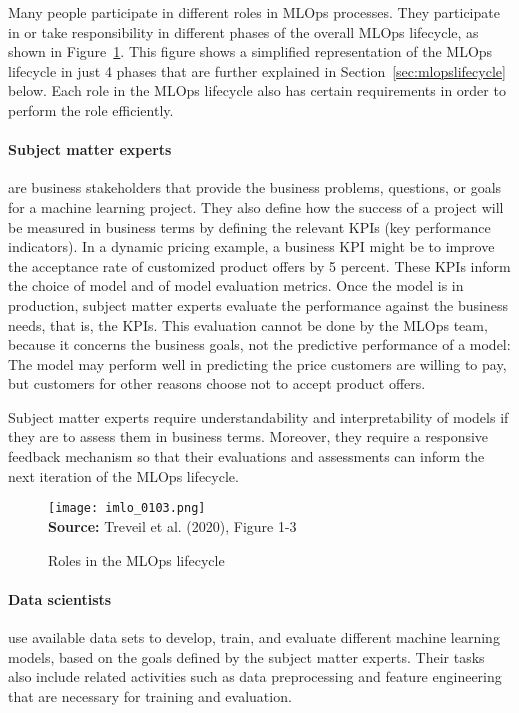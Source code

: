 Many people participate in different roles in MLOps processes. They participate in or take responsibility in different phases of the overall MLOps lifecycle, as shown in Figure~\ref{fig:mlopsroles}. This figure shows a simplified representation of the MLOps lifecycle in just 4 phases that are further explained in Section~\ref{sec:mlopslifecycle} below. Each role in the MLOps lifecycle also has certain requirements in order to perform the role efficiently.

\paragraph*{Subject matter experts} are business stakeholders that provide the business problems, questions, or goals for a machine learning project. They also define how the success of a project will be measured in business terms by defining the relevant KPIs (key performance indicators). In a dynamic pricing example, a business KPI might be to improve the acceptance rate of customized product offers by 5 percent. These KPIs inform the choice of model and of model evaluation metrics. Once the model is in production, subject matter experts evaluate the performance against the business needs, that is, the KPIs. This evaluation cannot be done by the MLOps team, because it concerns the business goals, not the predictive performance of a model: The model may perform well in predicting the price customers are willing to pay, but customers for other reasons choose not to accept product offers.

Subject matter experts require understandability and interpretability of models if they are to assess them in business terms. Moreover, they require a responsive feedback mechanism so that their evaluations and assessments can inform the next iteration of the MLOps lifecycle.

\begin{figure}
\centering
\texttt{[image: imlo\_0103.png]} \\

\scriptsize \textbf{Source:} Treveil et al. (2020), Figure 1-3
\caption{Roles in the MLOps lifecycle}
\label{fig:mlopsroles}
\end{figure}

\paragraph*{Data scientists} use available data sets to develop, train, and evaluate different machine learning models, based on the goals defined by the subject matter experts. Their tasks also include related activities such as data preprocessing and feature engineering that are necessary for training and evaluation. 

